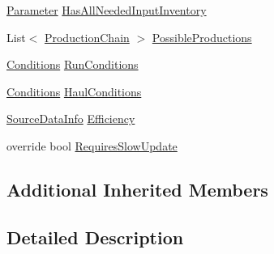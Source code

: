 \begin{DoxyCompactItemize}
\item 
\hyperlink{class_parameter}{Parameter} \hyperlink{class_project_porcupine_1_1_buildable_1_1_components_1_1_workshop_aa078f7dba5791c83438dcaa5975703b1}{Has\+All\+Needed\+Input\+Inventory}
\item 
List$<$ \hyperlink{class_project_porcupine_1_1_buildable_1_1_components_1_1_workshop_1_1_production_chain}{Production\+Chain} $>$ \hyperlink{class_project_porcupine_1_1_buildable_1_1_components_1_1_workshop_a72227db84558a7f574f4e26b97920757}{Possible\+Productions}
\item 
\hyperlink{class_project_porcupine_1_1_buildable_1_1_components_1_1_buildable_component_1_1_conditions}{Conditions} \hyperlink{class_project_porcupine_1_1_buildable_1_1_components_1_1_workshop_abaea7b615e40b9512cbbe2b5d7c4a4b0}{Run\+Conditions}
\item 
\hyperlink{class_project_porcupine_1_1_buildable_1_1_components_1_1_buildable_component_1_1_conditions}{Conditions} \hyperlink{class_project_porcupine_1_1_buildable_1_1_components_1_1_workshop_a206a3373e68eb6e145bde69fe24aa9ba}{Haul\+Conditions}
\item 
\hyperlink{class_project_porcupine_1_1_buildable_1_1_components_1_1_buildable_component_1_1_source_data_info}{Source\+Data\+Info} \hyperlink{class_project_porcupine_1_1_buildable_1_1_components_1_1_workshop_a7e1619e087cf4b0a5c03a71a3f3312ee}{Efficiency}
\item 
override bool \hyperlink{class_project_porcupine_1_1_buildable_1_1_components_1_1_workshop_a64a55c81a9fa14f7ec1644d4df482a13}{Requires\+Slow\+Update}
\end{DoxyCompactItemize}
\subsection*{Additional Inherited Members}


\subsection{Detailed Description}


